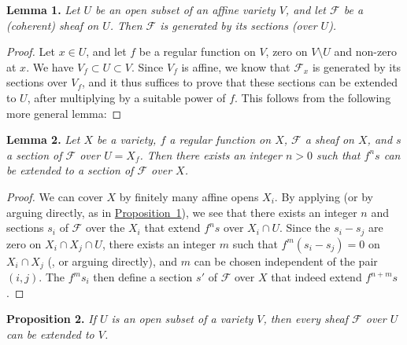 \documentclass{article}
\newenvironment{itenv}[1]
  {\phantomsection\par\medskip\noindent\textbf{#1.}\itshape}
  {\medskip}
\newcommand{\scr}[1]{{\mathscr{#1}}}
\newcommand{\oldpage}[1]{\marginpar{\footnotesize$\Big\vert$ \textit{p.~#1}}}
\begin{document}
\begin{itenv}{Lemma 1}
\label{lemma1}
  Let $U$ be an open subset of an affine variety $V$, and let $\scr{F}$ be a (coherent) sheaf on $U$.
  Then $\scr{F}$ is generated by its sections (over $U$).
\end{itenv}

\begin{proof}
  Let $x\in U$, and let $f$ be a regular function on $V$, zero on $V\setminus U$ and non-zero at $x$.
  We have $V_f\subset U\subset V$.
  Since $V_f$ is affine, we know \cite{12} that $\scr{F}_x$ is generated by its sections over $V_f$, and it thus suffices to prove that these sections can be extended to $U$, after multiplying by a suitable power of $f$.
  This follows from the following more general lemma:
\end{proof}

\begin{itenv}{Lemma 2}
\label{lemma2}
  Let $X$ be a variety, $f$ a regular function on $X$, $\scr{F}$ a sheaf on $X$, and $s$ a section of $\scr{F}$ over $U=X_f$.
  Then there exists an integer $n>0$ such that $f^ns$ can be extended to a section of $\scr{F}$ over $X$.
\end{itenv}

\begin{proof}
  We can cover $X$ by finitely many affine opens $X_i$.
  By applying \cite[lemma~1, p.~247]{12} (or by arguing directly, as in \hyperref[proposition1]{Proposition~1}), we see that there exists an integer $n$ and sections $s_i$ of $\scr{F}$ over the $X_i$ that extend $f^ns$ over $X_i\cap U$.
  Since the $s_i-s_j$ are zero on $X_i\cap X_j\cap U$, there exists an integer $m$ such that $f^m(s_i-s_j)=0$ on $X_i\cap X_j$ (\cite[p.~235]{12}, or arguing directly), and $m$ can be chosen independent of the pair $(i,j)$.
  The $f^ms_i$ then define a section $s'$ of $\scr{F}$ over $X$ that indeed extend $f^{n+m}s$.
\end{proof}

\begin{itenv}{Proposition 2}
\label{proposition2}
\oldpage{99}
  If $U$ is an open subset of a variety $V$, then every sheaf $\scr{F}$ over $U$ can be extended to $V$.
\end{itenv}
\end{document}
